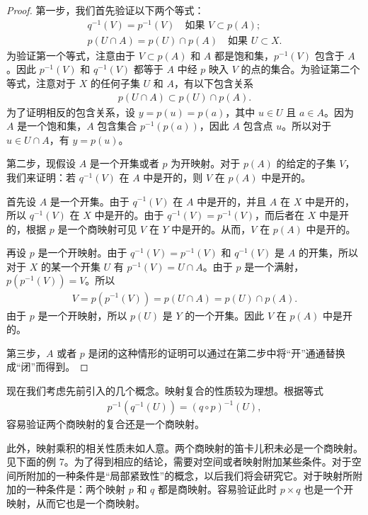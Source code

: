 \documentclass[../../main.tex]{subfiles}
\begin{document}
\begin{proof}
第一步，我们首先验证以下两个等式：
\begin{align*}
q^{-1}(V) = p^{-1}(V) \quad \text{如果 } V \subset p(A); \\
p(U \cap A) = p(U) \cap p(A) \quad \text{如果 } U \subset X.
\end{align*}
为验证第一个等式，注意由于 $V \subset p(A)$ 和 $A$ 都是饱和集，$p^{-1}(V)$ 包含于 $A$。因此 $p^{-1}(V)$ 和 $q^{-1}(V)$ 都等于 $A$ 中经 $p$ 映入 $V$ 的点的集合。为验证第二个等式，注意对于 $X$ 的任何子集 $U$ 和 $A$，有以下包含关系
\begin{align*}
p(U \cap A) \subset p(U) \cap p(A).
\end{align*}
为了证明相反的包含关系，设 $y = p(u) = p(a)$，其中 $u \in U$ 且 $a \in A$。因为 $A$ 是一个饱和集，$A$ 包含集合 $p^{-1}(p(a))$，因此 $A$ 包含点 $u$。所以对于 $u \in U \cap A$，有 $y = p(u)$。

第二步，现假设 $A$ 是一个开集或者 $p$ 为开映射。对于 $p(A)$ 的给定的子集 $V$，我们来证明：若 $q^{-1}(V)$ 在 $A$ 中是开的，则 $V$ 在 $p(A)$ 中是开的。

首先设 $A$ 是一个开集。由于 $q^{-1}(V)$ 在 $A$ 中是开的，并且 $A$ 在 $X$ 中是开的，所以 $q^{-1}(V)$ 在 $X$ 中是开的。由于 $q^{-1}(V) = p^{-1}(V)$，而后者在 $X$ 中是开的，根据 $p$ 是一个商映射可见 $V$ 在 $Y$ 中是开的。从而，$V$ 在 $p(A)$ 中是开的。

再设 $p$ 是一个开映射。由于 $q^{-1}(V) = p^{-1}(V)$ 和 $q^{-1}(V)$ 是 $A$ 的开集，所以对于 $X$ 的某一个开集 $U$ 有 $p^{-1}(V) = U \cap A$。由于 $p$ 是一个满射，$p(p^{-1}(V)) = V$。所以
\begin{align*}
V = p(p^{-1}(V)) = p(U \cap A) = p(U) \cap p(A).
\end{align*}
由于 $p$ 是一个开映射，所以 $p(U)$ 是 $Y$ 的一个开集。因此 $V$ 在 $p(A)$ 中是开的。

第三步，$A$ 或者 $p$ 是闭的这种情形的证明可以通过在第二步中将“开”通通替换成“闭”而得到。
\end{proof}

现在我们考虑先前引入的几个概念。映射复合的性质较为理想。根据等式
\begin{align*}
p^{-1}(q^{-1}(U)) = (q \circ p)^{-1}(U),
\end{align*}
容易验证两个商映射的复合还是一个商映射。

此外，映射乘积的相关性质未如人意。两个商映射的笛卡儿积未必是一个商映射。见下面的例 7。为了得到相应的结论，需要对空间或者映射附加某些条件。对于空间所附加的一种条件是“局部紧致性”的概念，以后我们将会研究它。对于映射所附加的一种条件是：两个映射 $p$ 和 $q$ 都是商映射。容易验证此时 $p \times q$ 也是一个开映射，从而它也是一个商映射。
\end{document}
